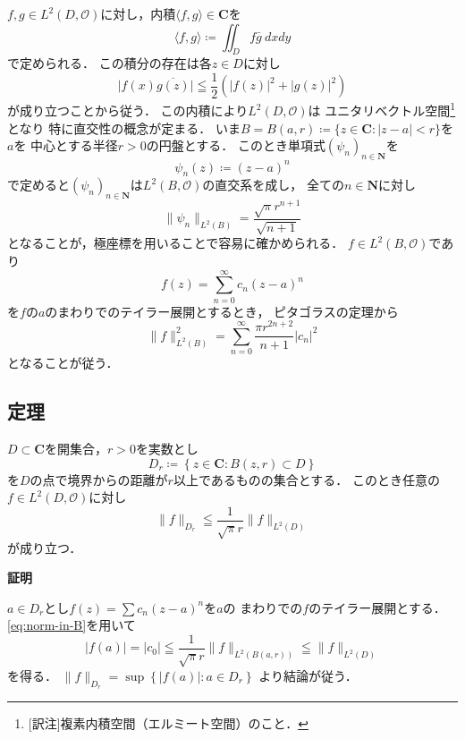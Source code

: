 \documentclass[12pt, a4paper, dvipdfmx]{jsarticle}
\makeatletter
\theoremstyle{definition}
\newcommand{\nn}{\mathbf{N}}
\newcommand{\cc}{\mathbf{C}}
\newcommand{\mcal}{\mathcal}
\newcommand{\OO}{\mcal{O}}
\newcommand{\abs}[1]{\lvert #1 \rvert}
\newcommand{\nm}[1]{\lVert #1 \rVert}
\theoremstyle{mystyle}
\renewcommand{\proofname}{\textbf{証明}}
\renewenvironment{proof}[1][\proofname]{\par
  \pushQED{\qed}%
  \normalfont \topsep6\p@\@plus6\p@\relax
  \trivlist
  \item\relax
  {\bfseries%
  #1\@addpunct{.}}\hspace\labelsep\ignorespaces
}{%
  \popQED\endtrivlist\@endpefalse
}
\numberwithin{equation}{section} %
\def\inner<#1>{\langle #1 \rangle}
\makeatother
\begin{document}
$f,g\in L^2(D,\OO)$に対し，内積$\inner<f,g>\in\cc$を
\begin{equation*}
  \inner<f,g>\coloneqq\iint_D f\bar{g}~dxdy
\end{equation*}
で定められる．
この積分の存在は各$z\in D$に対し
\begin{equation*}
  \abs{f(x)\overline{g(z)}}
  \leqq\frac{1}{2}\left(\abs{f(z)}^2+\abs{g(z)}^2\right)
\end{equation*}
が成り立つことから従う．
この内積により$L^2(D,\OO)$は
ユニタリベクトル空間\footnote{
  [訳注]複素内積空間（エルミート空間）のこと．
}となり
特に直交性の概念が定まる．
いま$B=B(a,r)\coloneqq\{z\in\cc: \abs{z-a}<r\}$を$a$を
中心とする半径$r>0$の円盤とする．
このとき単項式$(\psi_n)_{n\in\nn}$を
\begin{equation*}
  \psi_n(z)\coloneqq(z-a)^n
\end{equation*}
で定めると$(\psi_n)_{n\in\nn}$は$L^2(B,\OO)$の直交系を成し，
全ての$n\in\nn$に対し
\begin{equation*}
  \nm{\psi_n}_{L^2(B)}=\frac{\sqrt{\pi}r^{n+1}}{\sqrt{n+1}}
\end{equation*}
となることが，極座標を用いることで容易に確かめられる．
$f\in L^2(B,\OO)$であり
\begin{equation*}
  f(z)=\sum_{n=0}^{\infty}c_n(z-a)^n
\end{equation*}
を$f$の$a$のまわりでのテイラー展開とするとき，
ピタゴラスの定理から
\begin{equation*}
  \nm{f}^2_{L^2(B)}
  =\sum_{n=0}^{\infty}
  \frac{\pi r^{2n+2}}{n+1}\abs{c_n}^2\tag{$\ast$}\label{eq:norm-in-B}
\end{equation*}
となることが従う．

\subsection{定理}\label{thm:norm}
$D\subset\cc$を開集合，$r>0$を実数とし
\begin{equation*}
  D_r\coloneqq\left\{z\in\cc:B(z,r)\subset D\right\}
\end{equation*}
を$D$の点で境界からの距離が$r$以上であるものの集合とする．
このとき任意の$f\in L^2(D,\OO)$に対し
\begin{equation*}
  \nm{f}_{D_r}\leqq \frac{1}{\sqrt{\pi}r}\nm{f}_{L^2(D)}
\end{equation*}
が成り立つ．

\begin{proof}
  $a\in D_{r}$とし$f(z)=\sum c_n(z-a)^n$を$a$の
  まわりでの$f$のテイラー展開とする．
  \eqref{eq:norm-in-B}を用いて
  \begin{equation*}
    \abs{f(a)}=\abs{c_0}\leqq\frac{1}{\sqrt{\pi}r}\nm{f}_{L^2(B(a,r))}\leqq\nm{f}_{L^2(D)}
  \end{equation*}
  を得る．
  $\nm{f}_{D_r}=\sup\left\{\abs{f(a)}\colon a\in D_r\right\}$
  より結論が従う．
\end{proof}
\end{document}
